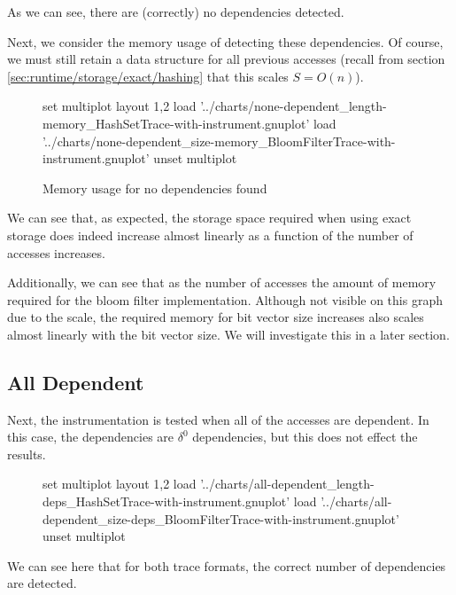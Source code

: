	As we can see, there are (correctly) no dependencies detected.
	
	Next, we consider the memory usage of detecting these dependencies. Of course, we must still retain a data structure for all previous accesses (recall from section \ref{sec:runtime/storage/exact/hashing} that this scales $S=O(n)$).
	
	\begin{figure}[H]
		\centering
		\begin{gnuplot}[terminal=pdf]
			set multiplot layout 1,2
				load '../charts/none-dependent_length-memory_HashSetTrace-with-instrument.gnuplot'
				load '../charts/none-dependent_size-memory_BloomFilterTrace-with-instrument.gnuplot'
			unset multiplot
		\end{gnuplot}
		\label{chart:none-dependent-memory-comparison}
		\caption{Memory usage for no dependencies found}
	\end{figure}
	
	We can see that, as expected, the storage space required when using exact storage does indeed increase almost linearly as a function of the number of accesses increases.
	
	Additionally, we can see that as the number of accesses the amount of memory required for the bloom filter implementation. Although not visible on this graph due to the scale, the required memory for bit vector size increases also scales almost linearly with the bit vector size. We will investigate this in a later section.
	
	\subsection{All Dependent} \label{sec:result/basic/all-dep}
	Next, the instrumentation is tested when all of the accesses are dependent. In this case, the dependencies are $\delta^{0}$ dependencies, but this does not effect the results.
	
	\begin{figure}[H]
		\begin{gnuplot}[terminal=pdf]
			set multiplot layout 1,2
				load '../charts/all-dependent_length-deps_HashSetTrace-with-instrument.gnuplot'
				load '../charts/all-dependent_size-deps_BloomFilterTrace-with-instrument.gnuplot'		
			unset multiplot
		\end{gnuplot}
	\end{figure}
	
	We can see here that for both trace formats, the correct number of dependencies are detected.
	
